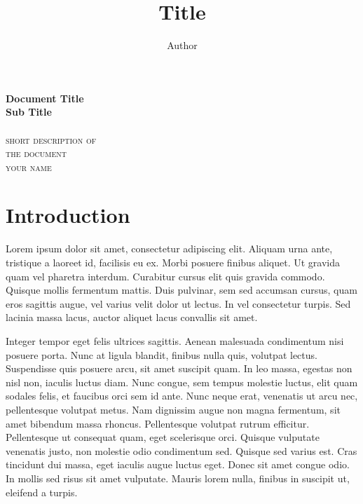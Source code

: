 \documentclass[12pt,a4paper]{article}
\title{ Title }
\author{ Author }
\begin{document}
\begin{center}
    \huge{\textbf{ Document Title }} \\
    \huge{\textbf{ Sub Title }}\\
    \hspace{200pt}\\
    \textsc{ short description of } \\
    \textsc{ the document }
    \vspace{280pt}\\
    \textsc{ your name }
\end{center}

\newpage
\tableofcontents
\newpage

\section{Introduction}



Lorem ipsum dolor sit amet, consectetur adipiscing elit. Aliquam urna ante, tristique a laoreet id, facilisis eu ex. Morbi posuere finibus aliquet. Ut gravida quam vel pharetra interdum. Curabitur cursus elit quis gravida commodo. Quisque mollis fermentum mattis. Duis pulvinar, sem sed accumsan cursus, quam eros sagittis augue, vel varius velit dolor ut lectus. In vel consectetur turpis. Sed lacinia massa lacus, auctor aliquet lacus convallis sit amet.

Integer tempor eget felis ultrices sagittis. Aenean malesuada condimentum nisi posuere porta. Nunc at ligula blandit, finibus nulla quis, volutpat lectus. Suspendisse quis posuere arcu, sit amet suscipit quam. In leo massa, egestas non nisl non, iaculis luctus diam. Nunc congue, sem tempus molestie luctus, elit quam sodales felis, et faucibus orci sem id ante. Nunc neque erat, venenatis ut arcu nec, pellentesque volutpat metus. Nam dignissim augue non magna fermentum, sit amet bibendum massa rhoncus. Pellentesque volutpat rutrum efficitur. Pellentesque ut consequat quam, eget scelerisque orci. Quisque vulputate venenatis justo, non molestie odio condimentum sed. Quisque sed varius est. Cras tincidunt dui massa, eget iaculis augue luctus eget. Donec sit amet congue odio. In mollis sed risus sit amet vulputate. Mauris lorem nulla, finibus in suscipit ut, eleifend a turpis.
\end{document}
